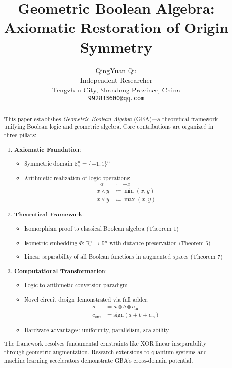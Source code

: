 \documentclass{article}
\title{Geometric Boolean Algebra: Axiomatic Restoration of Origin Symmetry}
\author{
 QingYuan Qu\\
  Independent Researcher\\
  Tengzhou City, Shandong Province, China \\
  \texttt{992883600@qq.com} 
}
\begin{document}
\maketitle

\begin{abstract}
This paper establishes \emph{Geometric Boolean Algebra} (GBA)---a theoretical framework unifying Boolean logic and geometric algebra. Core contributions are organized in three pillars:

\begin{enumerate}
\item \textbf{Axiomatic Foundation}:
\begin{itemize}
\item Symmetric domain $\mathbb{B}_s^n = \{-1,1\}^n$
\item Arithmetic realization of logic operations:
\begin{align*}
\neg x &\coloneqq -x \\
x \land y &\coloneqq \min(x,y) \\
x \lor y &\coloneqq \max(x,y)
\end{align*}
\end{itemize}

\item \textbf{Theoretical Framework}:
\begin{itemize}
\item Isomorphism proof to classical Boolean algebra (Theorem 1)
\item Isometric embedding $\Phi: \mathbb{B}_s^n \to \mathbb{R}^n$ with distance preservation (Theorem 6)
\item Linear separability of all Boolean functions in augmented spaces (Theorem 7)
\end{itemize}

\item \textbf{Computational Transformation}:
\begin{itemize}
\item Logic-to-arithmetic conversion paradigm
\item Novel circuit design demonstrated via full adder:
\begin{align*}
s &= a \otimes b \otimes c_{\text{in}} \\
c_{\text{out}} &= \mathrm{sign}(a+b+c_{\text{in}})
\end{align*}
\item Hardware advantages: uniformity, parallelism, scalability
\end{itemize}
\end{enumerate}

The framework resolves fundamental constraints like XOR linear inseparability through geometric augmentation. Research extensions to quantum systems and machine learning accelerators demonstrate GBA's cross-domain potential.
\end{abstract}
\end{document}
